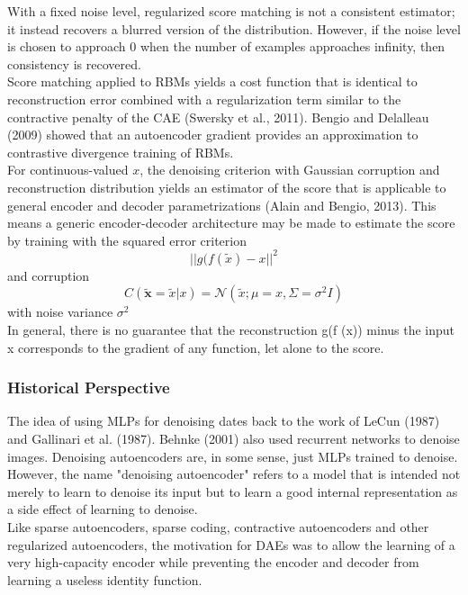 \documentclass[11pt]{article}
\begin{document}
With a fixed noise level, regularized score matching is not a consistent estimator; it instead recovers a blurred version of the distribution. However, if the noise level is chosen to approach 0 when the number of examples approaches infinity, then consistency is recovered.\\


Score matching applied to RBMs yields a cost function that is identical to reconstruction error combined with a regularization term similar to the contractive penalty of the CAE (Swersky et al., 2011). Bengio and Delalleau (2009) showed that an autoencoder gradient provides an approximation to contrastive divergence training of RBMs.\\


For continuous-valued \(x\), the denoising criterion with Gaussian corruption and reconstruction distribution yields an estimator of the score that is applicable to general encoder and decoder parametrizations (Alain and Bengio, 2013). This means a generic encoder-decoder architecture may be made to estimate the score by training with the squared error criterion\\
\begin{equation}
||g(f(\tilde{x}) - x||^2
\end{equation}
and corruption\\
\begin{equation}
C(\tilde{\mathbf{x}} = \tilde{x}|x) = \mathcal{N}(\tilde{x}; \mu = x, \Sigma = \sigma^2 I)
\end{equation}
with noise variance \(\sigma^2\)\\


In general, there is no guarantee that the reconstruction g(f (x)) minus the input x corresponds to the gradient of any function, let alone to the score.\\

\subsubsection{Historical Perspective}
\label{sec:org23d3177}
The idea of using MLPs for denoising dates back to the work of LeCun (1987) and Gallinari et al. (1987). Behnke (2001) also used recurrent networks to denoise images. Denoising autoencoders are, in some sense, just MLPs trained to denoise. However, the name "denoising autoencoder" refers to a model that is intended not merely to learn to denoise its input but to learn a good internal representation as a side effect of learning to denoise.\\


Like sparse autoencoders, sparse coding, contractive autoencoders and other regularized autoencoders, the motivation for DAEs was to allow the learning of a very high-capacity encoder while preventing the encoder and decoder from learning a useless identity function.\\
\end{document}
